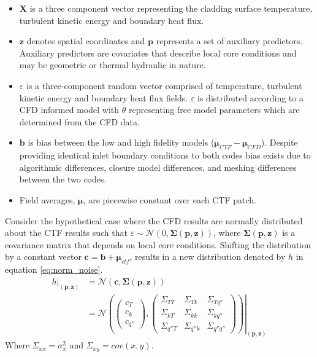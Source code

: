 \begin{itemize}
        \item $\mathbf X$ is a three component vector representing the cladding surface temperature, turbulent kinetic energy and boundary heat flux.
        \item $\mathbf z$ denotes spatial coordinates and $\mathbf p$ represents a set of auxiliary predictors.  Auxiliary predictors are covariates that describe local core conditions and may be geometric or thermal hydraulic in nature.
        \item  $\varepsilon$ is a three-component random vector comprised of temperature, turbulent kinetic energy and boundary heat flux fields.  $\varepsilon$ is distributed according to a CFD informed model with $\theta$ representing free model parameters which are determined from the CFD data.
        \item $\bm b$ is bias between the low and high fidelity models ($\bm \mu_{CTF} - \bm \mu_{CFD}$).  Despite providing identical inlet boundary conditions to both codes bias exists due to algorithmic differences, closure model differences, and meshing differences between the two codes.
        \item Field averages, $\bm \mu$, are piecewise constant over each CTF patch.
\end{itemize}

Consider the hypothetical case where the CFD results are normally distributed about the CTF results such that $\varepsilon \sim \mathcal N(0, \bm \Sigma(\mathbf p, \mathbf z))$, where $ \bm \Sigma(\mathbf p, \mathbf z)$ is a covariance matrix that depends on local core conditions.  Shifting the distribution by a constant vector $\bm c=\bm b + \bm \mu_{ctf}$, results in a new distribution denoted by $h$ in equation \ref{eq:norm_noise}.
\begin{align}
    \left. h \right|_{(\bm p, \bm z)} & = \mathcal N(\bm c, \bm \Sigma(\mathbf p, \bm z)) \nonumber \\
    & = \left.
        \mathcal N \left(
        \begin{pmatrix}
            c_T \\
            c_k \\
            c_{q''}
        \end{pmatrix}
    ,
        \begin{pmatrix}
            \Sigma_{TT} & \Sigma_{Tk} & \Sigma_{Tq''} \\
            \Sigma_{kT} & \Sigma_{kk} & \Sigma_{kq''} \\
            \Sigma_{q''T} & \Sigma_{q''k} & \Sigma_{q''q''}
        \end{pmatrix}
    \right)
    \right|_{(\mathbf p, \mathbf z)}
\label{eq:norm_noise}
\end{align}
Where $\Sigma_{xx} = \sigma_x^2$ and $\Sigma_{xy} = cov(x,y)$.

